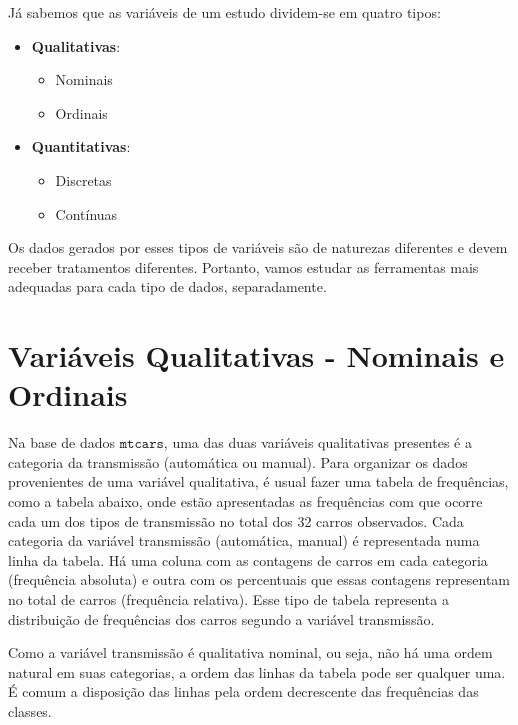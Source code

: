 \documentclass[
]{book}
\providecommand{\tightlist}{%
  \setlength{\itemsep}{0pt}\setlength{\parskip}{0pt}}
\begin{document}
Já sabemos que as variáveis de um estudo dividem-se em quatro tipos:

\begin{itemize}
\item
  \textbf{Qualitativas}:

  \begin{itemize}
  \tightlist
  \item
    Nominais
  \item
    Ordinais
  \end{itemize}
\item
  \textbf{Quantitativas}:

  \begin{itemize}
  \tightlist
  \item
    Discretas
  \item
    Contínuas
  \end{itemize}
\end{itemize}

Os dados gerados por esses tipos de variáveis são de naturezas diferentes e devem receber tratamentos diferentes. Portanto, vamos estudar as ferramentas mais adequadas para cada tipo de dados, separadamente.

\hypertarget{variuxe1veis-qualitativas---nominais-e-ordinais}{%
\section{Variáveis Qualitativas - Nominais e Ordinais}\label{variuxe1veis-qualitativas---nominais-e-ordinais}}

Na base de dados \(\texttt{mtcars}\), uma das duas variáveis qualitativas presentes é a categoria da transmissão (automática ou manual). Para organizar os dados provenientes de uma variável qualitativa, é usual fazer uma tabela de frequências, como a tabela abaixo, onde estão apresentadas as frequências com que ocorre cada um dos tipos de transmissão no total dos 32 carros observados. Cada categoria da variável transmissão (automática, manual) é representada numa linha da tabela. Há uma coluna com as contagens de carros em cada categoria (frequência absoluta) e outra com os percentuais que essas contagens representam no total de carros (frequência relativa). Esse tipo de tabela representa a distribuição de frequências dos carros segundo a variável transmissão.

Como a variável transmissão é qualitativa nominal, ou seja, não há uma ordem natural em suas categorias, a ordem das linhas da tabela pode ser qualquer uma. É comum a disposição das linhas pela ordem decrescente das frequências das classes.
\end{document}
